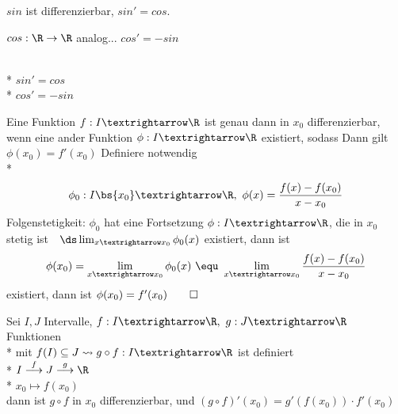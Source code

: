{{\Rarr{} $sin$ ist differenzierbar, $sin' = cos$.}
\item{$cos: \R \to \R$ analog... $cos' = -sin$\\
\\*
$sin' = cos$\\*
$cos' = -sin$}
}

Eine Funktion $f:I→\R$ ist genau dann in $x_0$ differenzierbar, wenn eine ander Funktion $\phi:I→\R$ existiert, sodass
Dann gilt $\phi(x_0) =f'(x_0)$
\bew
Definiere notwendig\\*
$$\phi_0:I\bs\{x_0\}→\R,\ \phi(x)=\frac{f(x)-f(x_0)}{x-x_0}$$
Folgenstetigkeit: $ \phi_0$ hat eine Fortsetzung $\phi:I→\R$, die in $x_0$ stetig ist\ \equ\ $\ds\lim_{x→x_0}\phi_0(x)$ existiert, dann ist 
$$\phi(x_0)=\lim_{x→x_0}\phi_0(x)\ \equ\ \lim_{x→x_0}\frac{f(x)-f(x_0)}{x-x_0}$$
existiert, dann ist $\phi(x_0)=f'(x_0)\qed$
%
%

Sei $I,J$ Intervalle, $f:I→\R,\ g:J→\R$ Funktionen\\*
mit $f(I)\subseteq J \leadsto g\circ f:I→\R$ ist definiert\\*
$I\stackrel{f}{\longrightarrow}J\stackrel{g}{\longrightarrow}\R$\\*
$x_0\longmapsto f(x_0)$\\
dann ist $g\circ f$ in $x_0$ differenzierbar,
und $(g\circ f)'(x_0)=g'(f(x_0))·f'(x_0)$
